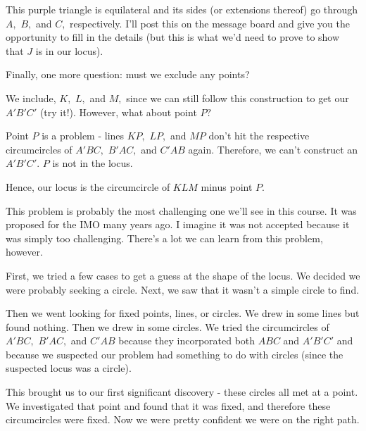 
This purple triangle is equilateral and its sides (or extensions thereof) go through $A,$ $B,$ and $C,$ respectively. I'll post this on the message board and give you the opportunity to fill in the details (but this is what we'd need to prove to show that $J$ is in our locus).

Finally, one more question: must we exclude any points?

We include, $K,$ $L,$ and $M,$ since we can still follow this construction to get our $A'B'C'$ (try it!). However, what about point $P?$

Point $P$ is a problem - lines $KP,$ $LP,$ and $MP$ don't hit the respective circumcircles of $A'BC,$ $B'AC,$ and $C'AB$ again. Therefore, we can't construct an $A'B'C'.$ $P $ is not in the locus.

Hence, our locus is the circumcircle of $KLM$ minus point $P.$

\begin{remark*}
    This problem is probably the most challenging one we'll see in this course. It was proposed for the IMO many years ago. I imagine it was not accepted because it was simply too challenging. There's a lot we can learn from this problem, however.    
\end{remark*}

First, we tried a few cases to get a guess at the shape of the locus. We decided we were probably seeking a circle. Next, we saw that it wasn't a simple circle to find.

Then we went looking for fixed points, lines, or circles. We drew in some lines but found nothing. Then we drew in some circles. We tried the circumcircles of $A'BC,$ $B'AC,$ and $C'AB$ because they incorporated both $ABC$ and $A'B'C'$ and because we suspected our problem had something to do with circles (since the suspected locus was a circle).

This brought us to our first significant discovery - these circles all met at a point. We investigated that point and found that it was fixed, and therefore these circumcircles were fixed. Now we were pretty confident we were on the right path.

